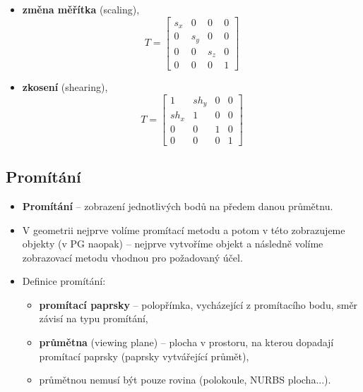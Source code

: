 \begin{itemize}
\begin{equation*}
	\end{equation*}
	\item \textbf{změna měřítka} (scaling),
	\begin{equation*}
	T = 	\begin{bmatrix}
	s_x & 0 & 0 & 0     	\\[0.3em]
	0 & s_y & 0 & 0      	\\[0.3em]
	0 & 0 & s_z & 0      	\\[0.3em]
	0 & 0 & 0 & 1      
	\end{bmatrix}
	\end{equation*}
	\item \textbf{zkosení} (shearing),
	\begin{equation*}
	T = 	\begin{bmatrix}
	1 & sh_y & 0 & 0       \\[0.3em]
	sh_x & 1 & 0 & 0       \\[0.3em]
	0 & 0 & 1 & 0       	\\[0.3em]
	0 & 0 & 0 & 1       
	\end{bmatrix}
	\end{equation*}
\end{itemize}

\subsection{Promítání}
\begin{itemize}
	\item \textbf{Promítání} -- zobrazení jednotlivých bodů na předem danou průmětnu.
	\item V geometrii nejprve volíme promítací metodu a potom v této zobrazujeme objekty (v PG naopak) -- nejprve vytvoříme objekt a následně volíme zobrazovací metodu vhodnou pro požadovaný účel.
	\item Definice promítání:
	\begin{itemize}
		\item \textbf{promítací paprsky} -- polopřímka, vycházející z promítacího bodu, směr závisí na typu promítání,
		\item \textbf{průmětna} (viewing plane) -- plocha v prostoru, na kterou dopadají promítací paprsky (paprsky vytvářející průmět),
		\item průmětnou nemusí být pouze rovina (polokoule, NURBS plocha...).
	\end{itemize}
\end{itemize}

